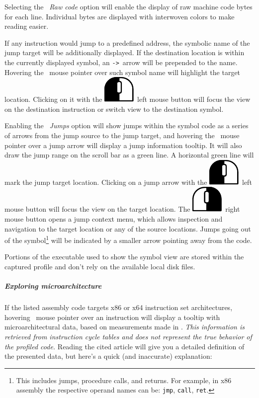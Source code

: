 \documentclass[hidelinks,titlepage,a4paper]{article}
\newcommand{\LMB}{\includegraphics[height=.8\baselineskip]{icons/lmb}}
\newcommand{\RMB}{\includegraphics[height=.8\baselineskip]{icons/rmb}}
\begin{document}
Selecting the \emph{\faCogs{}~Raw code} option will enable the display of raw machine code bytes for each line. Individual bytes are displayed with interwoven colors to make reading easier.

If any instruction would jump to a predefined address, the symbolic name of the jump target will be additionally displayed. If the destination location is within the currently displayed symbol, an \texttt{->}~arrow will be prepended to the name. Hovering the \faMousePointer{}~mouse pointer over such symbol name will highlight the target location. Clicking on it with the \LMB{}~left mouse button will focus the view on the destination instruction or switch view to the destination symbol.

Enabling the \emph{\faShare{}~Jumps} option will show jumps within the symbol code as a series of arrows from the jump source to the jump target, and hovering the \faMousePointer{}~mouse pointer over a jump arrow will display a jump information tooltip. It will also draw the jump range on the scroll bar as a green line. A horizontal green line will mark the jump target location. Clicking on a jump arrow with the \LMB{}~left mouse button will focus the view on the target location. The \RMB{}~right mouse button opens a jump context menu, which allows inspection and navigation to the target location or any of the source locations. Jumps going out of the symbol\footnote{This includes jumps, procedure calls, and returns. For example, in x86 assembly the respective operand names can be: \texttt{jmp}, \texttt{call}, \texttt{ret}.} will be indicated by a smaller arrow pointing away from the code.

Portions of the executable used to show the symbol view are stored within the captured profile and don't rely on the available local disk files.

\subparagraph{Exploring microarchitecture}

If the listed assembly code targets x86 or x64 instruction set architectures, hovering \faMousePointer{}~mouse pointer over an instruction will display a tooltip with microarchitectural data, based on measurements made in \cite{Abel19a}. \emph{This information is retrieved from instruction cycle tables and does not represent the true behavior of the profiled code.} Reading the cited article will give you a detailed definition of the presented data, but here's a quick (and inaccurate) explanation:
\end{document}

